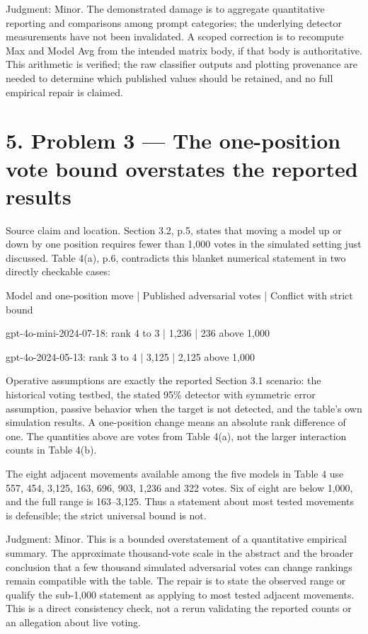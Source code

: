 \documentclass[10pt]{article}
\begin{document}
Judgment: Minor. The demonstrated damage is to aggregate quantitative reporting and comparisons among prompt categories; the underlying detector measurements have not been invalidated. A scoped correction is to recompute Max and Model Avg from the intended matrix body, if that body is authoritative. This arithmetic is verified; the raw classifier outputs and plotting provenance are needed to determine which published values should be retained, and no full empirical repair is claimed.\par
\section*{5. Problem 3 — The one-position vote bound overstates the reported results}
Source claim and location. Section 3.2, p.5, states that moving a model up or down by one position requires fewer than 1,000 votes in the simulated setting just discussed. Table 4(a), p.6, contradicts this blanket numerical statement in two directly checkable cases:\par
Model and one-position move | Published adversarial votes | Conflict with strict bound\par
gpt-4o-mini-2024-07-18: rank 4 to 3 | 1,236 | 236 above 1,000\par
gpt-4o-2024-05-13: rank 3 to 4 | 3,125 | 2,125 above 1,000\par
Operative assumptions are exactly the reported Section 3.1 scenario: the historical voting testbed, the stated 95\% detector with symmetric error assumption, passive behavior when the target is not detected, and the table’s own simulation results. A one-position change means an absolute rank difference of one. The quantities above are votes from Table 4(a), not the larger interaction counts in Table 4(b).\par
The eight adjacent movements available among the five models in Table 4 use 557, 454, 3,125, 163, 696, 903, 1,236 and 322 votes. Six of eight are below 1,000, and the full range is 163–3,125. Thus a statement about most tested movements is defensible; the strict universal bound is not.\par
Judgment: Minor. This is a bounded overstatement of a quantitative empirical summary. The approximate thousand-vote scale in the abstract and the broader conclusion that a few thousand simulated adversarial votes can change rankings remain compatible with the table. The repair is to state the observed range or qualify the sub-1,000 statement as applying to most tested adjacent movements. This is a direct consistency check, not a rerun validating the reported counts or an allegation about live voting.\par
\end{document}
